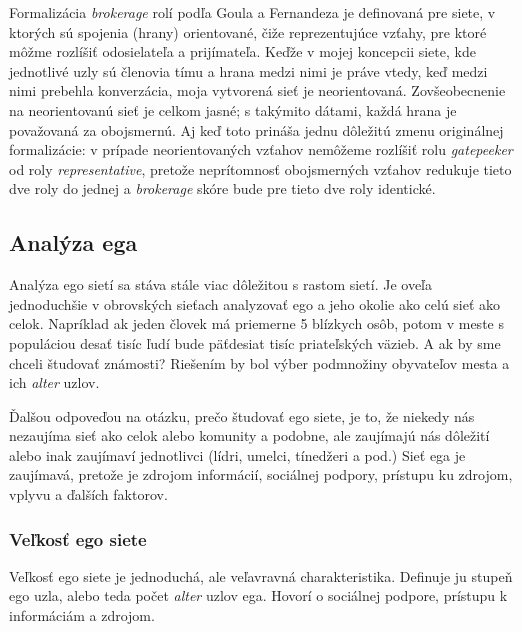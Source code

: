 \documentclass[slovak,master,public,dept460,male,cpdeclaration,oneside]{diploma}
\begin{document}
Formalizácia \textit{brokerage} rolí podľa Goula a Fernandeza je definovaná pre siete, v ktorých sú spojenia (hrany) orientované, čiže reprezentujúce vzťahy, pre ktoré môžme rozlíšiť odosielateľa a prijímateľa. Keďže v mojej koncepcii siete, kde jednotlivé uzly sú členovia tímu a hrana medzi nimi je práve vtedy, keď medzi nimi prebehla konverzácia, moja vytvorená sieť je neorientovaná. Zovšeobecnenie na neorientovanú sieť je celkom jasné; s takýmito dátami, každá hrana je považovaná za obojsmernú. Aj keď toto prináša jednu dôležitú zmenu originálnej formalizácie: v prípade neorientovaných vzťahov nemôžeme rozlíšiť rolu \textit{gatepeeker} od roly \textit{representative}, pretože neprítomnosť obojsmerných vzťahov redukuje tieto dve roly do jednej a \textit{brokerage} skóre bude pre tieto dve roly identické. \cite{19}

\subsection{Analýza ega}
Analýza ego sietí sa stáva stále viac dôležitou s rastom sietí. Je oveľa jednoduchšie v obrovských sieťach analyzovať ego a jeho okolie ako celú sieť ako celok. Napríklad ak jeden človek má priemerne 5 blízkych osôb, potom v meste s populáciou desať tisíc ľudí bude päťdesiat tisíc priateľských väzieb. A ak by sme chceli študovať známosti? Riešením by bol výber podmnožiny obyvateľov mesta a ich \textit{alter} uzlov.


Ďalšou odpoveďou na otázku, prečo študovať ego siete, je to, že niekedy nás nezaujíma sieť ako celok alebo komunity a podobne, ale zaujímajú nás dôležití alebo inak zaujímaví jednotlivci (lídri, umelci, tínedžeri a pod.) Sieť ega je zaujímavá, pretože je zdrojom informácií, sociálnej podpory, prístupu ku zdrojom, vplyvu a ďalších faktorov.

\subsubsection{Veľkosť ego siete}
Veľkosť ego siete je jednoduchá, ale veľavravná charakteristika. Definuje ju stupeň ego uzla, alebo teda počet \textit{alter} uzlov ega. Hovorí o sociálnej podpore, prístupu k informáciám a zdrojom.
\end{document}
